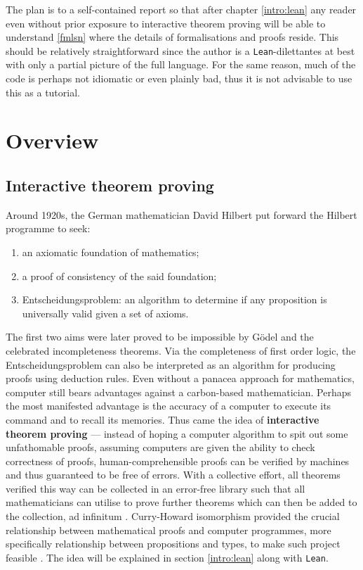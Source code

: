 \documentclass{report}
\theoremstyle{definition}
\theoremstyle{plain}
\begin{document}
The plan is to a self-contained report so that after chapter \ref{intro:lean} any reader even without prior exposure to interactive theorem proving will be able to understand \ref{fmlsn} where the details of formalisations and proofs reside. This should be relatively straightforward since the author is a {\tt Lean}-dilettantes at best with only a partial picture of the full language. For the same reason, much of the code is perhaps not idiomatic or even plainly bad, thus it is not advisable to use this as a tutorial.

\chapter{Overview}
\section{Interactive theorem proving}
Around 1920s, the German mathematician David Hilbert put forward the Hilbert programme to seek:
\begin{enumerate}
  \item an axiomatic foundation of mathematics;
  \item a proof of consistency of the said foundation;
  \item Entscheidungsproblem: an algorithm to determine if any proposition is universally valid given a set of axioms.
\end{enumerate}
The first two aims were later proved to be impossible by G\"odel and the celebrated incompleteness theorems. Via the completeness of first order logic, the Entscheidungsproblem can also be interpreted as an algorithm for producing proofs using deduction rules. Even without a panacea approach for mathematics, computer still bears advantages against a carbon-based mathematician. Perhaps the most manifested advantage is the accuracy of a computer to execute its command and to recall its memories. Thus came the idea of {\bf interactive theorem proving} --- instead of hoping a computer algorithm to spit out some unfathomable proofs, assuming computers are given the ability to check correctness of proofs, human-comprehensible proofs can be verified by machines and thus guaranteed to be free of errors. With a collective effort, all theorems verified this way can be collected in an error-free library such that all mathematicians can utilise to prove further theorems which can then be added to the collection, ad infinitum \cite{boyer1994qed}. Curry-Howard isomorphism provided the crucial relationship between mathematical proofs and computer programmes, more specifically relationship between propositions and types, to make such project feasible \cite{kennedy2011set}. The idea will be explained in section \ref{intro:lean} along with {\tt Lean}. 
\end{document}
